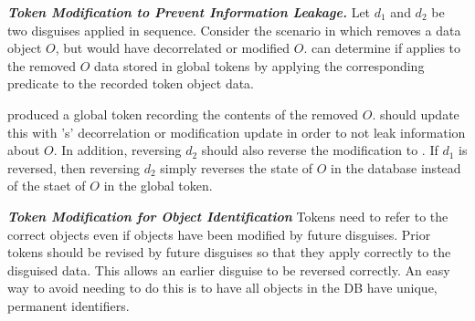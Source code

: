 \vspace{6pt}\noindent\textbf{\emph{Token Modification to Prevent Information Leakage.}}
Let $d_1$ and $d_2$ be two disguises applied in sequence.
Consider the scenario in which  removes a data object $O$, but  would have decorrelated
or modified $O$.
\sys can determine if  applies to the removed $O$ data stored in global tokens by applying
the corresponding  predicate to the recorded token object data.

 produced a global token  recording the contents of the removed $O$.
\sys should update this  with 's' decorrelation or modification update in order
to not leak information about $O$.
In addition, reversing $d_2$ should also reverse the modification to . If $d_1$ is
reversed, then reversing $d_2$ simply reverses the state of $O$ in the database instead of the staet
of $O$ in the global token.

\vspace{6pt}\noindent\textbf{\emph{Token Modification for Object Identification}}
Tokens need to refer to the correct objects even if objects have been modified by future disguises.
Prior tokens should be revised by future disguises so that they apply correctly to the disguised
data.
This allows an earlier disguise to be reversed correctly.
An easy way to avoid needing to do this is to have all objects in the DB have unique, permanent
identifiers.



